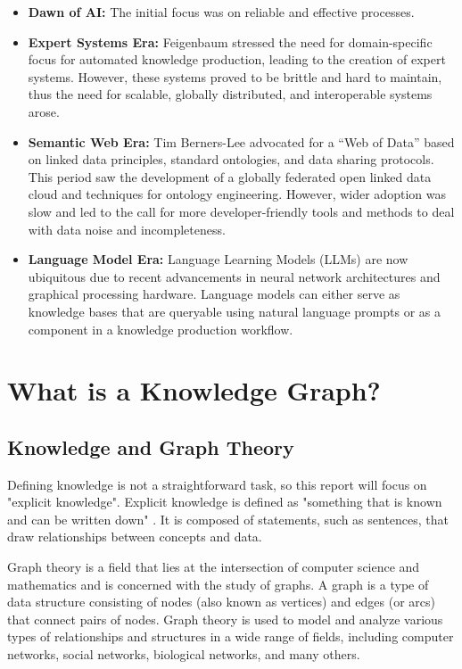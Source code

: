 \documentclass[11pt]{article} %
\begin{document}
\begin{itemize}
    \item \textbf{Dawn of AI:} The initial focus was on reliable and effective processes.
    \item \textbf{Expert Systems Era:} Feigenbaum stressed the need for domain-specific focus for automated knowledge production, leading to the creation of expert systems. However, these systems proved to be brittle and hard to maintain, thus the need for scalable, globally distributed, and interoperable systems arose.
    \item \textbf{Semantic Web Era:} Tim Berners-Lee advocated for a “Web of Data” based on linked data principles, standard ontologies, and data sharing protocols. This period saw the development of a globally federated open linked data cloud and techniques for ontology engineering. However, wider adoption was slow and led to the call for more developer-friendly tools and methods to deal with data noise and incompleteness.
    \item \textbf{Language Model Era:} Language Learning Models (LLMs) are now ubiquitous due to recent advancements in neural network architectures and graphical processing hardware. Language models can either serve as knowledge bases that are queryable using natural language prompts or as a component in a knowledge production workflow.
\end{itemize}

\section{What is a Knowledge Graph?}

\subsection{Knowledge and Graph Theory}
Defining knowledge is not a straightforward task, so this report will focus on "explicit knowledge". Explicit knowledge is defined as "something that is known and can be written down" \cite[p.4]{KG21}. It is composed of statements, such as sentences, that draw relationships between concepts and data.

Graph theory is a field that lies at the intersection of computer science and mathematics and is concerned with the study of graphs. A graph is a type of data structure consisting of nodes (also known as vertices) and edges (or arcs) that connect pairs of nodes. Graph theory is used to model and analyze various types of relationships and structures in a wide range of fields, including computer networks, social networks, biological networks, and many others.
\end{document}
